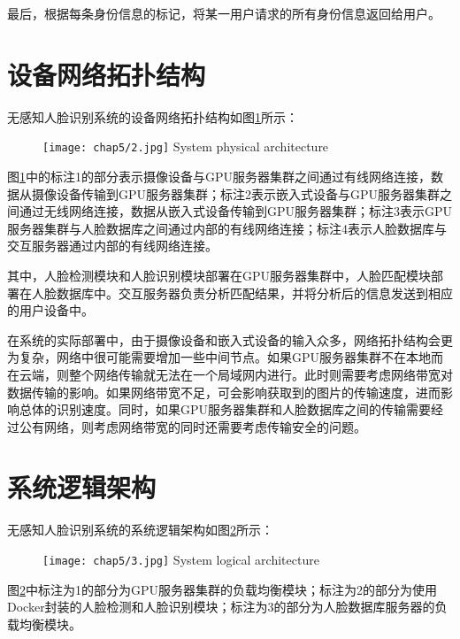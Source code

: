 最后，根据每条身份信息的标记，将某一用户请求的所有身份信息返回给用户。

\section{设备网络拓扑结构}

无感知人脸识别系统的设备网络拓扑结构如图\ref{fig:chap5:phy}所示：

\begin{figure}[!htp]
	\centering
	\texttt{[image: chap5/2.jpg]}
	{System physical architecture}
	\label{fig:chap5:phy}
\end{figure}

图\ref{fig:chap5:phy}中的标注1的部分表示摄像设备与GPU服务器集群之间通过有线网络连接，数据从摄像设备传输到GPU服务器集群；标注2表示嵌入式设备与GPU服务器集群之间通过无线网络连接，数据从嵌入式设备传输到GPU服务器集群；标注3表示GPU服务器集群与人脸数据库之间通过内部的有线网络连接；标注4表示人脸数据库与交互服务器通过内部的有线网络连接。

其中，人脸检测模块和人脸识别模块部署在GPU服务器集群中，人脸匹配模块部署在人脸数据库中。交互服务器负责分析匹配结果，并将分析后的信息发送到相应的用户设备中。

在系统的实际部署中，由于摄像设备和嵌入式设备的输入众多，网络拓扑结构会更为复杂，网络中很可能需要增加一些中间节点。如果GPU服务器集群不在本地而在云端，则整个网络传输就无法在一个局域网内进行。此时则需要考虑网络带宽对数据传输的影响。如果网络带宽不足，可会影响获取到的图片的传输速度，进而影响总体的识别速度。同时，如果GPU服务器集群和人脸数据库之间的传输需要经过公有网络，则考虑网络带宽的同时还需要考虑传输安全的问题。


\section{系统逻辑架构}

无感知人脸识别系统的系统逻辑架构如图\ref{fig:chap5:logic}所示：

\begin{figure}[!htp]
	\centering
	\texttt{[image: chap5/3.jpg]}
	{System logical architecture}
	\label{fig:chap5:logic}
\end{figure}

图\ref{fig:chap5:logic}中标注为1的部分为GPU服务器集群的负载均衡模块；标注为2的部分为使用Docker封装的人脸检测和人脸识别模块；标注为3的部分为人脸数据库服务器的负载均衡模块。

